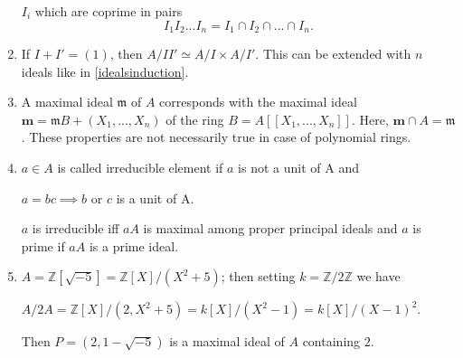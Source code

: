 \begin{enumerate}
            $I_i$ which are coprime in pairs
            $$I_1I_2...I_n=I_1\cap I_2 \cap ... \cap I_n.$$
      \item
            If $I+I' = (1)$, then $A/II'\simeq A/I \times A/I'$. This can be
            extended with $n$ ideals like in \ref{idealsinduction}.
      \item
            A maximal ideal $\mathfrak{m}$ of $A$ corresponds with the maximal
            ideal $\mathbf{m}=\mathfrak{m}B + (X_1,...,X_n)$ of the ring
            $B=A[[X_1,...,X_n]]$. Here, $\mathbf{m}\cap A = \mathfrak{m}$. These
            properties are not necessarily true in case of polynomial rings.
      \item
            $a\in A$ is called irreducible element if $a$ is not a unit of A
            and \begin{center}
                  $a=bc\implies b $ or $c$ is a unit of A.
            \end{center}
            $a$ is irreducible iff $aA$ is maximal among proper principal ideals
            and $a$ is prime if $aA$ is a prime ideal.
      \item
            $A=\mathbb{Z}[\sqrt{-5}]=\mathbb{Z}[X]/(X^2+5)$; then setting
            $k=\mathbb{Z}/2\mathbb{Z}$ we have
            \begin{center}
                  $A/2A=\mathbb{Z}[X]/(2,X^2+5)=k[X]/(X^2-1)=k[X]/(X-1)^2$.
            \end{center}
            Then $P=(2,1-\sqrt{-5})$ is a maximal ideal of $A$ containing $2$.
\end{enumerate}